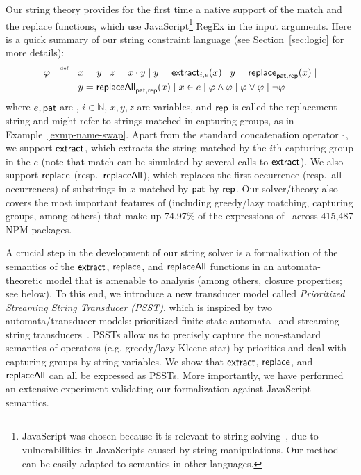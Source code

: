 Our string theory provides for the first time a native support of the match and the 
replace functions, which use JavaScript\footnote{JavaScript was chosen 
because it is relevant to string solving~\cite{BEK,Berkeley-JavaScript}, due to vulnerabilities in JavaScripts 
caused by string manipulations. Our method can be easily adapted to \regexp{}
semantics in other languages.} RegEx in the input arguments. Here is a quick
summary of our string constraint language (see Section~\ref{sec:logic} for
more details):
\[
\begin{array}{l c l}
\smallskip
\varphi & \eqdef  & x = y \mid z = x \concat y \mid y  = \extract_{i, e}(x) \mid
y  = \replace_{\pat, \rep}(x) \mid 
\\
& & y = \replaceall_{\pat, \rep}(x)   \mid
 x \in e \mid \varphi \wedge \varphi \mid \varphi \vee \varphi \mid \neg \varphi \
\label{eq:SL}
\end{array}
\]
where $e, \mathsf{pat}$ are \regexps, $i \in \mathbb{N}$, $x,y,z$ are variables, and $\mathsf{rep}$ 
is called the
replacement string and might refer to strings matched in capturing groups,
as in Example~\ref{exmp-name-swap}. Apart from the standard concatenation
operator $\cdot$, we support $\mathsf{extract}$, which extracts the string matched by
the $i$th capturing group in the \regexp{} $e$ (note that match can be simulated
by several calls to $\mathsf{extract}$). We also support $\mathsf{replace}$ 
(resp.~$\mathsf{replaceAll}$), which replaces the first occurrence (resp.~all
occurrences) of substrings in $x$ matched by $\mathsf{pat}$ by $\mathsf{rep}$. Our solver/theory
also covers the most important features of \regexp{} (including greedy/lazy
matching, capturing groups, among others) that make up 74.97\% of the \regexp{}
expressions of~\cite{LMK19} across 415,487 NPM packages. 

A crucial step in the development of our string solver is a formalization of
the semantics of the $\mathsf{extract}$, $\mathsf{replace}$, and $\mathsf{replaceAll}$ functions in
an automata-theoretic model that is amenable to analysis (among others, closure
properties; see below).
%
To this end, we introduce a new 
transducer model called \emph{Prioritized Streaming String Transducer (PSST)},
which is inspired by %
two automata/transducer models: prioritized finite-state automata~\cite{BM17} 
and streaming string transducers~\cite{AC10,AD11}. PSSTs allow us to precisely
capture the non-standard semantics of \regexp{} operators (e.g. greedy/lazy Kleene star) by priorities and 
deal with capturing groups by string variables. 
We show that $\mathsf{extract}$, $\mathsf{replace}$, and $\mathsf{replaceAll}$ can all be expressed as 
PSSTs. More importantly, we have performed an extensive experiment
validating our formalization against JavaScript semantics. 

